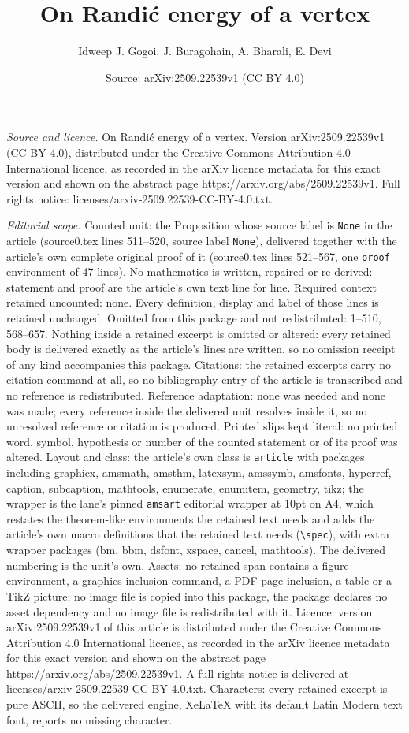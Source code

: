 \documentclass[10pt,a4paper]{amsart}
\title[On Randi\'c energy of a vertex]{On Randi\'c energy of a vertex}
\author{Idweep J. Gogoi, J. Buragohain, A. Bharali, E. Devi}
\date{Source: arXiv:2509.22539v1 (CC BY 4.0)}
\begin{document}
\maketitle

\noindent\emph{Source and licence.} On Randi\'c energy of a vertex. Version arXiv:2509.22539v1 (CC BY 4.0), distributed under the Creative Commons Attribution 4.0 International licence, as recorded in the arXiv licence metadata for this exact version and shown on the abstract page https://arxiv.org/abs/2509.22539v1. Full rights notice: licenses/arxiv-2509.22539-CC-BY-4.0.txt.\par\smallskip

\noindent\textit{Editorial scope.} Counted unit: the Proposition whose source label is \texttt{None} in the article (source0.tex lines 511--520, source label \texttt{None}), delivered together with the article's own complete original proof of it (source0.tex lines 521--567, one \texttt{proof} environment of 47 lines). No mathematics is written, repaired or re-derived: statement and proof are the article's own text line for line. Required context retained uncounted: none. Every definition, display and label of those lines is retained unchanged. Omitted from this package and not redistributed: 1--510, 568--657. Nothing inside a retained excerpt is omitted or altered: every retained body is delivered exactly as the article's lines are written, so no omission receipt of any kind accompanies this package. Citations: the retained excerpts carry no citation command at all, so no bibliography entry of the article is transcribed and no reference is redistributed. Reference adaptation: none was needed and none was made; every reference inside the delivered unit resolves inside it, so no unresolved reference or citation is produced. Printed slips kept literal: no printed word, symbol, hypothesis or number of the counted statement or of its proof was altered. Layout and class: the article's own class is \texttt{article} with packages including graphicx, amsmath, amsthm, latexsym, amssymb, amsfonts, hyperref, caption, subcaption, mathtools, enumerate, enumitem, geometry, tikz; the wrapper is the lane's pinned \texttt{amsart} editorial wrapper at 10pt on A4, which restates the theorem-like environments the retained text needs and adds the article's own macro definitions that the retained text needs (\texttt{\textbackslash spec}), with extra wrapper packages (bm, bbm, dsfont, xspace, cancel, mathtools). The delivered numbering is the unit's own. Assets: no retained span contains a figure environment, a graphics-inclusion command, a PDF-page inclusion, a table or a TikZ picture; no image file is copied into this package, the package declares no asset dependency and no image file is redistributed with it. Licence: version arXiv:2509.22539v1 of this article is distributed under the Creative Commons Attribution 4.0 International licence, as recorded in the arXiv licence metadata for this exact version and shown on the abstract page https://arxiv.org/abs/2509.22539v1. A full rights notice is delivered at licenses/arxiv-2509.22539-CC-BY-4.0.txt. Characters: every retained excerpt is pure ASCII, so the delivered engine, XeLaTeX with its default Latin Modern text font, reports no missing character.
\end{document}

